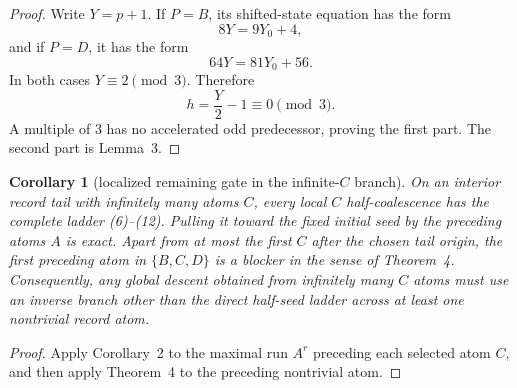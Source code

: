 \documentclass[11pt]{article}
\newtheorem{corollary}[theorem]{Corollary}
\begin{document}
\begin{proof}
Write $Y=p+1$.  If $P=B$, its shifted-state equation has the form
\[
 8Y=9Y_0+4,
\]
and if $P=D$, it has the form
\[
 64Y=81Y_0+56.
\]
In both cases $Y\equiv2\pmod3$.  Therefore
\[
 h=\frac{Y}{2}-1\equiv0\pmod3.
\]
A multiple of $3$ has no accelerated odd predecessor, proving the first
part.  The second part is Lemma~3.
\end{proof}

\begin{corollary}[localized remaining gate in the infinite-$C$ branch]
On an interior record tail with infinitely many atoms $C$, every local
$C$ half-coalescence has the complete ladder (6)--(12).  Pulling it toward
the fixed initial seed by the preceding atoms $A$ is exact.  Apart from at
most the first $C$ after the chosen tail origin, the first preceding atom
in $\{B,C,D\}$ is a blocker in the sense of Theorem~4.
Consequently, any global descent obtained from infinitely many $C$ atoms
must use an inverse branch other than the direct half-seed ladder across
at least one nontrivial record atom.
\end{corollary}

\begin{proof}
Apply Corollary~2 to the maximal run $A^r$ preceding each selected atom
$C$, and then apply Theorem~4 to the preceding nontrivial atom.
\end{proof}
\end{document}
